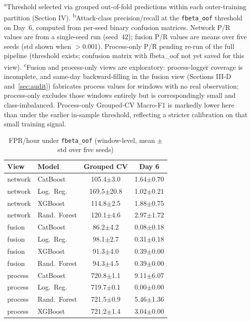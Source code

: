 \documentclass[conference]{IEEEtran}
\begin{document}
\begin{table}[t]
\vspace{2pt}
\raggedright\footnotesize
\textsuperscript{a}Threshold selected via grouped out-of-fold predictions within each outer-training
partition (Section IV). \textsuperscript{b}Attack-class precision/recall at the \texttt{fbeta\_oof} threshold on Day~6,
computed from per-seed binary confusion matrices. Network P/R values are from a single-seed run
(seed~42); fusion P/R values are means over five seeds (std shown when $>$0.001). Process-only
P/R pending re-run of the full pipeline (threshold exists; confusion matrix with fbeta\_oof not
yet saved for this view). \textsuperscript{c}Fusion and process-only views are exploratory: process-logger
coverage is incomplete, and same-day backward-filling in the fusion view (Sections III-D
and~\ref{sec:audit}) fabricates process values for windows with no real observation; process-only excludes
those windows entirely but is correspondingly small and class-imbalanced. Process-only Grouped-CV Macro-F1
is markedly lower here than under the earlier in-sample threshold, reflecting a stricter calibration on
that small training signal.
\end{table}

\begin{table}[t]
\caption{FPR/hour under \texttt{fbeta\_oof} (window-level, mean $\pm$ std over five seeds)}
\label{tab:fpr}
\centering
\scriptsize
\begin{tabular}{llcc}
\toprule
View & Model & Grouped CV & Day 6 \\
\midrule
network & CatBoost      & 105.4$\pm$3.0  & 1.64$\pm$0.70 \\
network & Log.\ Reg.    & 169.5$\pm$20.8 & 1.02$\pm$0.21 \\
network & XGBoost       & 114.8$\pm$2.5  & 1.88$\pm$0.75 \\
network & Rand.\ Forest & 120.1$\pm$4.6  & 2.97$\pm$1.72 \\
fusion  & CatBoost      & 86.2$\pm$4.2   & 0.08$\pm$0.18 \\
fusion  & Log.\ Reg.    & 98.1$\pm$2.7   & 0.31$\pm$0.18 \\
fusion  & XGBoost       & 91.3$\pm$4.0   & 0.39$\pm$0.00 \\
fusion  & Rand.\ Forest & 94.3$\pm$4.5   & 0.39$\pm$0.00 \\
process & CatBoost      & 720.8$\pm$1.1  & 9.11$\pm$6.07 \\
process & Log.\ Reg.    & 719.7$\pm$0.1  & 0.00$\pm$0.00 \\
process & Rand.\ Forest & 721.5$\pm$0.9  & 5.46$\pm$1.36 \\
process & XGBoost       & 721.2$\pm$1.4  & 3.04$\pm$0.00 \\
\bottomrule
\end{tabular}
\end{table}
\end{document}

